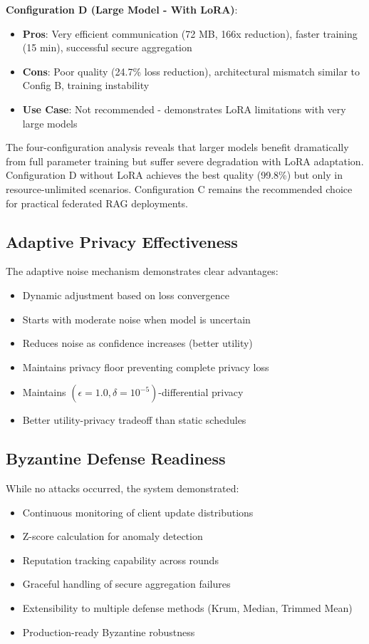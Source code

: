 \documentclass[conference]{IEEEtran}
\begin{document}
\textbf{Configuration D (Large Model - With LoRA)}:
\begin{itemize}
    \item \textbf{Pros}: Very efficient communication (72 MB, 166x reduction), faster training (15 min), successful secure aggregation
    \item \textbf{Cons}: Poor quality (24.7\% loss reduction), architectural mismatch similar to Config B, training instability
    \item \textbf{Use Case}: Not recommended - demonstrates LoRA limitations with very large models
\end{itemize}

The four-configuration analysis reveals that larger models benefit dramatically from full parameter training but suffer severe degradation with LoRA adaptation. Configuration D without LoRA achieves the best quality (99.8\%) but only in resource-unlimited scenarios. Configuration C remains the recommended choice for practical federated RAG deployments.

\subsection{Adaptive Privacy Effectiveness}

The adaptive noise mechanism demonstrates clear advantages:
\begin{itemize}
    \item Dynamic adjustment based on loss convergence
    \item Starts with moderate noise when model is uncertain
    \item Reduces noise as confidence increases (better utility)
    \item Maintains privacy floor preventing complete privacy loss
    \item Maintains $(\epsilon=1.0, \delta=10^{-5})$-differential privacy
    \item Better utility-privacy tradeoff than static schedules
\end{itemize}

\subsection{Byzantine Defense Readiness}

While no attacks occurred, the system demonstrated:
\begin{itemize}
    \item Continuous monitoring of client update distributions
    \item Z-score calculation for anomaly detection
    \item Reputation tracking capability across rounds
    \item Graceful handling of secure aggregation failures
    \item Extensibility to multiple defense methods (Krum, Median, Trimmed Mean)
    \item Production-ready Byzantine robustness
\end{itemize}
\end{document}
